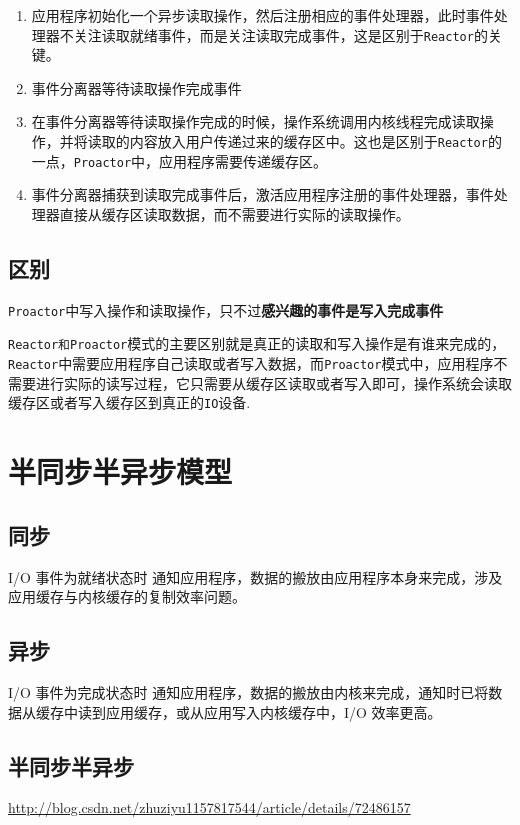 \documentclass[UTF8,a4paper,8pt]{ctexbook}
\begin{document}
			\begin{enumerate}
				\item 应用程序初始化一个异步读取操作，然后注册相应的事件处理器，此时事件处理器不关注读取就绪事件，而是关注读取完成事件，这是区别于\verb|Reactor|的关键。
				\item 事件分离器等待读取操作完成事件
				\item 在事件分离器等待读取操作完成的时候，操作系统调用内核线程完成读取操作，并将读取的内容放入用户传递过来的缓存区中。这也是区别于\verb|Reactor|的一点，\verb|Proactor|中，应用程序需要传递缓存区。
				\item 事件分离器捕获到读取完成事件后，激活应用程序注册的事件处理器，事件处理器直接从缓存区读取数据，而不需要进行实际的读取操作。
			\end{enumerate}
		
		\subsection{区别}
			\verb|Proactor|中写入操作和读取操作，只不过\textbf{感兴趣的事件是写入完成事件}
		
			\verb|Reactor和Proactor|模式的主要区别就是真正的读取和写入操作是有谁来完成的，\verb|Reactor|中需要应用程序自己读取或者写入数据，而\verb|Proactor|模式中，应用程序不需要进行实际的读写过程，它只需要从缓存区读取或者写入即可，操作系统会读取缓存区或者写入缓存区到真正的\verb|IO|设备.
	
	\section{半同步半异步模型}
		\subsection{同步}
			I/O 事件为就绪状态时 通知应用程序，数据的搬放由应用程序本身来完成，涉及应用缓存与内核缓存的复制效率问题。
			
		\subsection{异步}
			I/O 事件为完成状态时 通知应用程序，数据的搬放由内核来完成，通知时已将数据从缓存中读到应用缓存，或从应用写入内核缓存中，I/O 效率更高。
			
		\subsection{半同步半异步}
			\url{http://blog.csdn.net/zhuziyu1157817544/article/details/72486157}
			
\end{document}
